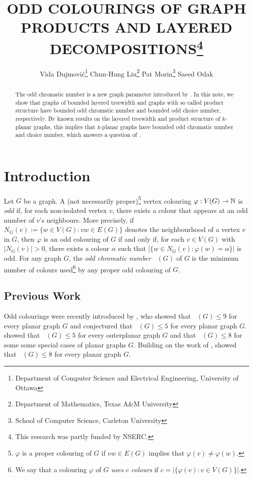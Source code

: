 \documentclass{patmorin}
\title{\MakeUppercase{Odd Colourings of Graph Products and Layered Decompositions}\thanks{This research was partly funded by NSERC.}}
\author{%
  Vida Dujmović\thanks{Department of Computer Science and Electrical Engineering, University of Ottawa}\qquad
  Chun-Hung Liu\thanks{Department of Mathematics, Texas A\&M University}\qquad
  Pat Morin\thanks{School of Computer Science, Carleton University}\qquad
  Saeed Odak\footnotemark[2]
}
\date{}
\DeclareMathOperator{\odd}{\chi_o}
\begin{document}
\maketitle

\begin{abstract}
  The odd chromatic number is a new graph parameter introduced by \citet{petrusevski.skrekovski:colorings}.  In this note, we show that graphs of bounded layered treewidth and graphs with so called product structure have bounded odd chromatic number and bounded odd choice number, respectively. By known results on the layered treewidth and product structure of $k$-planar graphs, this implies that $k$-planar graphs have bounded odd chromatic number and choice number, which answers a question of \citet{cranston.lafferty.ea:note}.
\end{abstract}

%

\section{Introduction}

Let $G$ be a graph.  A (not necessarily proper)\footnote{$\varphi$ is a proper colouring of $G$ if $vw\in E(G)$ implies that $\varphi(v)\neq\varphi(w)$.} vertex colouring $\varphi:V(G)\to\mathbb{N}$ is \emph{odd} if, for each non-isolated vertex $v$, there exists a colour that appears at an odd number of $v$'s neighbours. More precisely, if $N_G(v):=\{w\in V(G):vw\in E(G)\}$ denotes the neighbourhood of a vertex $v$ in $G$, then $\varphi$ is an odd colouring of $G$ if and only if, for each $v\in V(G)$ with $|N_G(v)|>0$, there exists a colour $\alpha$ such that $|\{w\in N_G(v): \varphi(w)=\alpha\}|$ is odd.  For any graph $G$, the \emph{odd chromatic number} $\odd(G)$ of $G$ is the minimum number of colours used\footnote{We say that a colouring $\varphi$ of $G$ \emph{uses $c$ colours} if $c=|\{\varphi(v):v\in V(G)\}|$.} by any proper odd colouring of $G$.

\subsection{Previous Work}

Odd colourings were recently introduced by \citet{petrusevski.skrekovski:colorings}, who showed that $\odd(G)\le 9$ for every planar graph $G$ and conjectured that $\odd(G)\le 5$ for every planar graph $G$. \citet{caro.petrusevski.ea:remarks} showed that $\odd(G)\le 5$ for every outerplanar graph $G$ and that $\odd(G)\le 8$ for some some special cases of planar graphs $G$.    Building on the work of \citet{caro.petrusevski.ea:remarks}, \citet{petr.portier:odd} showed that $\odd(G)\le 8$ for every planar graph $G$.
\end{document}
